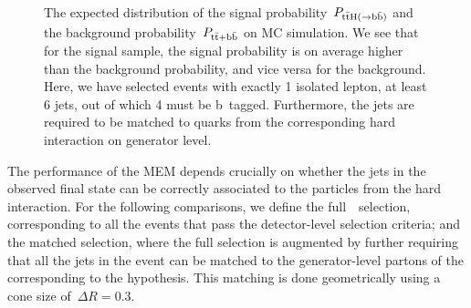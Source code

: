 \begin{figure}[ht]
\begin{centering}
\\
\caption[The distributions of the MEM signal and background probabilities]{The expected distribution of the signal probability~$P_{\mathrm{t} \bar{\mathrm{t}} \mathrm{H} (\rightarrow \mathrm{b}\bar{\mathrm{b}})}$ and the background probability~$P_{\mathrm{t} \bar{\mathrm{t}} + \mathrm{b}\bar{\mathrm{b}}}$ on MC simulation. We see that for the signal sample, the signal probability is on average higher than the background probability, and vice versa for the background. Here, we have selected events with exactly 1 isolated lepton, at least 6 jets, out of which 4 must be b~tagged. Furthermore, the jets are required to be matched to quarks from the corresponding hard interaction on generator level.}
\label{fig:mem_proba}
\end{centering}
\end{figure}

The performance of the MEM depends crucially on whether the jets in the observed final state can be correctly associated to the particles from the hard interaction. For the following comparisons, we define the full~\ttHbb~selection, corresponding to all the events that pass the detector-level selection criteria; and the matched selection, where the full selection is augmented by further requiring that all the jets in the event can be matched to the generator-level partons of the corresponding to the hypothesis. This matching is done geometrically using a cone size of~$\Delta R = 0.3$.

